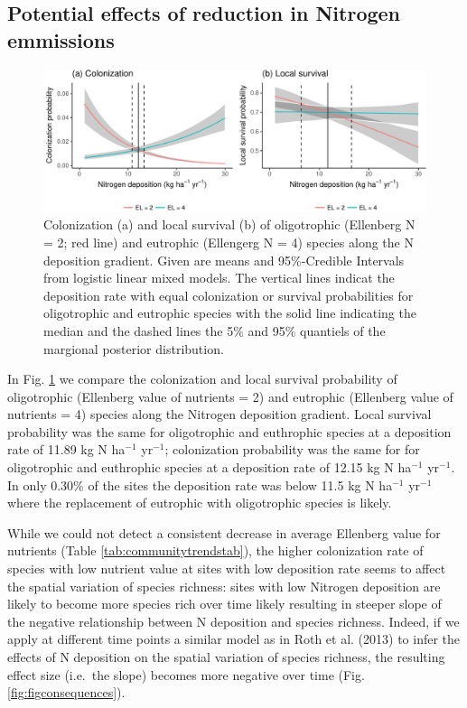 \documentclass[fleqn,10pt,lineno]{wlpeerj} %
\theoremstyle{definition}
\theoremstyle{definition}
\theoremstyle{definition}
\theoremstyle{remark}
\begin{document}
\subsection*{Potential effects of reduction in Nitrogen
emmissions}\label{potential-effects-of-reduction-in-nitrogen-emmissions}

\begin{figure}
\includegraphics[width=1\linewidth]{Manuscript_files/figure-latex/cl-1} \caption{Colonization (a) and local survival (b) of oligotrophic (Ellenberg N = 2; red line) and eutrophic (Ellengerg N = 4) species along the N deposition gradient. Given are means and 95\%-Credible Intervals from logistic linear mixed models. The vertical lines indicat the deposition rate with equal colonization or survival probabilities for oligotrophic and eutrophic species with the solid line indicating the median and the dashed lines the 5\% and 95\% quantiels of the margional posterior distribution.}\label{fig:cl}
\end{figure}

In Fig. \ref{fig:cl} we compare the colonization and local survival
probability of oligotrophic (Ellenberg value of nutrients = 2) and
eutrophic (Ellenberg value of nutrients = 4) species along the Nitrogen
deposition gradient. Local survival probability was the same for
oligotrophic and euthrophic species at a deposition rate of 11.89 kg N
ha\(^{-1}\) yr\(^{-1}\); colonization probability was the same for for
oligotrophic and euthrophic species at a deposition rate of 12.15 kg N
ha\(^{-1}\) yr\(^{-1}\). In only 0.30\% of the sites the deposition rate
was below 11.5 kg N ha\(^{-1}\) yr\(^{-1}\) where the replacement of
eutrophic with oligotrophic species is likely.

While we could not detect a consistent decrease in average Ellenberg
value for nutrients (Table \ref{tab:communitytrendstab}), the higher
colonization rate of species with low nutrient value at sites with low
deposition rate seems to affect the spatial variation of species
richness: sites with low Nitrogen deposition are likely to become more
species rich over time likely resulting in steeper slope of the negative
relationship between N deposition and species richness. Indeed, if we
apply at different time points a similar model as in Roth et al. (2013)
to infer the effects of N deposition on the spatial variation of species
richness, the resulting effect size (i.e.~the slope) becomes more
negative over time (Fig. \ref{fig:figconsequences}).
\end{document}
